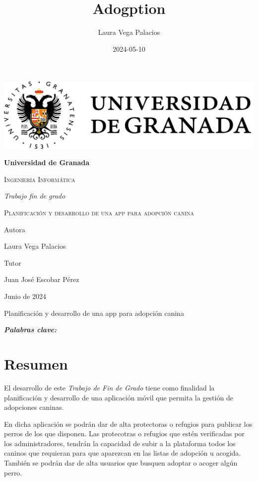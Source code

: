 \documentclass[a4paper, 12pt]{article}
\title{Adogption}
\date{2024-05-10}
\author{Laura Vega Palacios}
\providecommand{\keywords}[1]{\textbf{\textit{Palabras clave:}} #1}
\begin{document}
\begin{titlepage}
	\pagestyle{plain}
	\centering
	{\includegraphics[width=1\textwidth]{logoUGR.png}\par}
	{\bfseries\LARGE Universidad de Granada \par}
	{\scshape\Large Ingeniería Informática \par}
	\vspace{0.5cm}
	{\itshape\Large Trabajo fin de grado \par}
	{\scshape\Huge Planificación y desarrollo de una app para adopción canina \par}
	\vfill
	{\Large Autora \par}
	{\Large Laura Vega Palacios\par}

	{\Large Tutor \par}
	{\Large Juan José Escobar Pérez\par}
	\vfill
	{\Large Junio de 2024 \par}
\end{titlepage} 

\newpage
\thispagestyle{empty}
\mbox{}

\newpage
\pagestyle{plain}

\begin{center} 
{\LARGE Planificación y desarrollo de una app para adopción canina \par}
\end{center} 

\keywords{}
\section*{Resumen}
El desarrollo de este \textit{Trabajo de Fin de Grado} tiene como finalidad la planificación y desarrollo de una aplicación móvil que permita la gestión de adopciones caninas. 

En dicha aplicación se podrán dar de alta protectoras o refugios para publicar los perros de los que disponen. Las protecotras o refugios que estén verificadas por los administradores, tendrán la capacidad de subir a la plataforma todos los caninos que requieran para que aparezcan en las listas de adopción u acogida. También se podrán dar de alta usuarios que busquen adoptar o acoger algún perro.  
\end{document}
